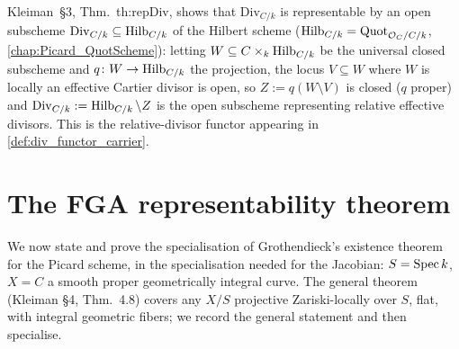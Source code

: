 \begin{remark}
  \label{rem:div_functor_representability}
  Kleiman~\S 3, Thm.~th:repDiv, shows that \(\mathrm{Div}_{C/k}\) is
  representable by an open subscheme \(\mathrm{Div}_{C/k} \subseteq
  \operatorname{Hilb}_{C/k}\) of the Hilbert scheme (\(\operatorname{Hilb}_{C/k} =
  \operatorname{Quot}_{\mathcal{O}_C/C/k}\), \cref{chap:Picard_QuotScheme}): letting
  \(W \subseteq C \times_k \operatorname{Hilb}_{C/k}\) be the universal closed
  subscheme and \(q \colon W \to \operatorname{Hilb}_{C/k}\) the projection, the locus
  \(V \subseteq W\) where \(W\) is locally an effective Cartier divisor
  is open, so \(Z := q(W \setminus V)\) is closed (\(q\) proper) and
  \(\mathrm{Div}_{C/k} := \operatorname{Hilb}_{C/k} \setminus Z\) is the open
  subscheme representing relative effective divisors. This is
  the relative-divisor functor appearing in
  \cref{def:div_functor_carrier}.
\end{remark}

\section{The FGA representability theorem}
\label{sec:fga_pic_representability}

We now state and prove the specialisation of Grothendieck's existence theorem
for the Picard scheme, in the specialisation needed for the Jacobian:
\(S = \operatorname{Spec} k\), \(X = C\) a smooth proper geometrically integral
curve. The general theorem (Kleiman \S 4, Thm.~4.8) covers any
\(X/S\) projective Zariski-locally over \(S\), flat, with integral geometric
fibers; we record the general statement and then specialise.

